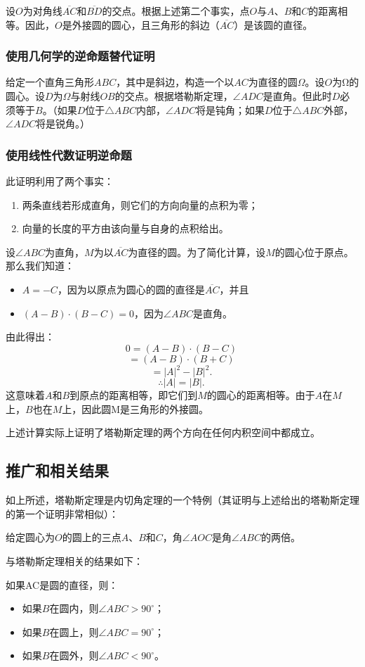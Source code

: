 设\(O\)为对角线\(\overline{AC}\)和\(\overline{BD}\)的交点。根据上述第二个事实，点\(O\)与\(A\)、\(B\)和\(C\)的距离相等。因此，\(O\)是外接圆的圆心，且三角形的斜边（\(\overline{AC}\)）是该圆的直径。
\subsubsection{使用几何学的逆命题替代证明} 
给定一个直角三角形\(ABC\)，其中是斜边，构造一个以\(AC\)为直径的圆\(\Omega\)。设\(O\)为Ω的圆心。设\(D\)为\(\Omega\)与射线\(OB\)的交点。根据塔勒斯定理，\(\angle ADC\)是直角。但此时\(D\)必须等于\(B\)。（如果\(D\)位于\(\triangle ABC\)内部，\(\angle ADC\)将是钝角；如果\(D\)位于\(\triangle ABC\)外部，\(\angle ADC\)将是锐角。）
\subsubsection{使用线性代数证明逆命题 } 
此证明利用了两个事实：
\begin{enumerate}
\item 两条直线若形成直角，则它们的方向向量的点积为零；
\item 向量的长度的平方由该向量与自身的点积给出。
\end{enumerate}
设\(\angle ABC\)为直角，\(M\)为以\(\overline{AC}\)为直径的圆。为了简化计算，设\(M\)的圆心位于原点。那么我们知道：
\begin{itemize}
\item \(A = -C\)，因为以原点为圆心的圆的直径是\(\overline{AC}\)，并且  
\item \((A - B) \cdot (B - C) = 0\)，因为\(\angle ABC\)是直角。
\end{itemize}
由此得出：
\[
0 = (A - B) \cdot (B - C)~
\]
\[
= (A - B) \cdot (B + C)~
\]
\[
= |A|^2 - |B|^2.~
\]
\[
\therefore |A| = |B|.~
\]
这意味着\(A\)和\(B\)到原点的距离相等，即它们到\(M\)的圆心的距离相等。由于\(A\)在\(M\)上，\( B\)也在\(M\)上，因此圆M是三角形的外接圆。

上述计算实际上证明了塔勒斯定理的两个方向在任何内积空间中都成立。
\subsection{推广和相关结果}  
如上所述，塔勒斯定理是内切角定理的一个特例（其证明与上述给出的塔勒斯定理的第一个证明非常相似）：

给定圆心为\(O\)的圆上的三点\(A\)、\(B\)和\(C\)，角\(\angle AOC\)是角\(\angle ABC\)的两倍。

与塔勒斯定理相关的结果如下：

如果AC是圆的直径，则：
\begin{itemize}
\item 如果\(B\)在圆内，则\(\angle ABC>90^\circ\)；
\item 如果\(B\)在圆上，则\(\angle ABC=90^\circ\)；
\item 如果\(B\)在圆外，则\(\angle ABC<90^\circ\)。
\end{itemize}
